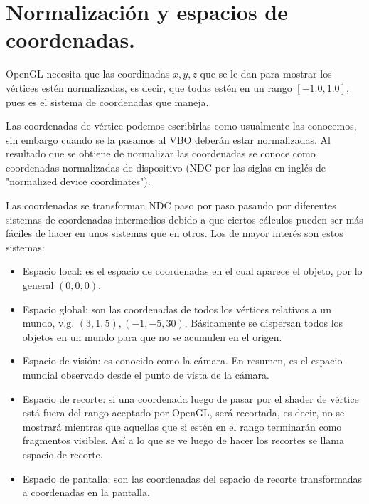 \section{Normalización y espacios de coordenadas.}
OpenGL necesita que las coordinadas $x, y, z$ que se le dan para mostrar
los vértices estén normalizadas, es decir, que todas estén en un rango $[-1.0, 1.0]$, pues es el sistema de coordenadas que maneja.\par

Las coordenadas de vértice podemos escribirlas como usualmente las conocemos, sin embargo cuando se la pasamos al VBO deberán estar normalizadas. Al resultado que se obtiene de normalizar las coordenadas se conoce como coordenadas normalizadas de dispositivo (NDC por las siglas en inglés de "normalized device coordinates").\par

Las coordenadas se transforman NDC paso por paso pasando por diferentes sistemas de coordenadas intermedios debido a que ciertos cálculos pueden ser más fáciles de hacer en unos sistemas que en otros. Los de mayor interés son estos sistemas: \par

\begin{itemize}
    \item Espacio local: es el espacio de coordenadas en el cual aparece el objeto, por lo general $(0, 0, 0)$.
    \item Espacio global: son las coordenadas de todos los vértices relativos a un mundo, v.g. $(3, 1, 5), (-1, -5, 30)$. Básicamente se dispersan todos los objetos en un mundo para que no se acumulen en el origen.
    \item Espacio de visión: es conocido como la cámara. En resumen, es el espacio mundial observado desde el punto de vista de la cámara.
    \item Espacio de recorte: si una coordenada luego de pasar por el shader de vértice está fuera del rango aceptado por OpenGL, será recortada, es decir, no se mostrará mientras que aquellas que si estén en el rango terminarán como fragmentos visibles. Así a lo que se ve luego de hacer los recortes se llama espacio de recorte.
    \item Espacio de pantalla: son las coordenadas del espacio de recorte transformadas a coordenadas en la pantalla.
\end{itemize}